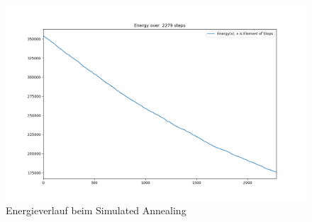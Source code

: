 \begin{figure}[H]\label{pic:Energy Annealing}
    \centering
    \includegraphics[width=\linewidth]{content/simulatedAnnealing/Bilder/Energy_2279_steps.png}
    \caption{Energieverlauf beim Simulated Annealing}
\end{figure}





